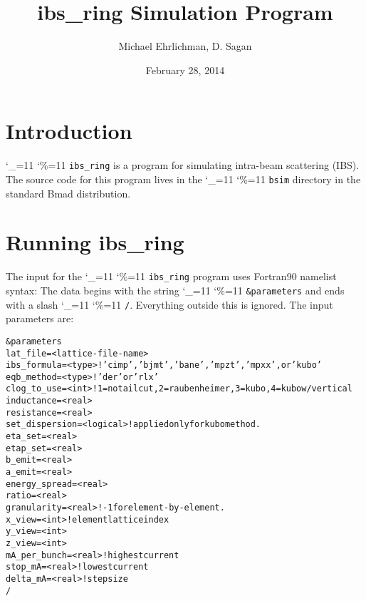 \documentclass[11pt]{article}
\title{ibs_ring Simulation Program}
\author{Michael Ehrlichman, D. Sagan}
\date{February 28, 2014}
\newcommand\ttcmd{\begingroup\catcode`\_=11 \catcode`\%=11 \dottcmd}
\newcommand\dottcmd[1]{\texttt{#1}\endgroup}
\newcommand{\vn}{\ttcmd}
\newlength{\ExBeg}
\newlength{\ExEnd}
\newenvironment{example}
  {\vspace{\ExBeg} \begin{alltt}}
  {\end{alltt} \vspace{\ExEnd}}
\begin{document}
\maketitle

\tableofcontents

\section{Introduction} 
\label{s:intro}

\vn{ibs_ring} is a program for simulating intra-beam scattering (IBS).
The source code for this program lives in the \vn{bsim} directory in
the standard Bmad\cite{b:bmad} distribution.

\section{Running ibs_ring} 
\label{s:run}

The input for the \vn{ibs_ring} program uses Fortran90 namelist
syntax: The data begins with the string \vn{\&parameters} and ends
with a slash \vn{/}. Everything outside this is ignored.
The input parameters are:
\begin{example}
\&parameters
  lat_file = <lattice-file-name>
  ibs_formula = <type>  ! 'cimp', 'bjmt', 'bane', 'mpzt', 'mpxx', or 'kubo'
  eqb_method = <type>   ! 'der' or 'rlx'
  clog_to_use = <int>   ! 1=no tail cut, 2=raubenheimer, 3=kubo, 4=kubo w/vertical
  inductance = <real>
  resistance = <real>
  set_dispersion = <logical> ! applied only for kubo method.
  eta_set = <real>
  etap_set = <real>
  b_emit = <real>
  a_emit = <real>
  energy_spread = <real>
  ratio = <real>
  granularity = <real>   ! -1 for element-by-element.
  x_view = <int>  ! element lattice index 
  y_view = <int>  
  z_view = <int>  
  mA_per_bunch = <real>  ! highest current
  stop_mA = <real>       ! lowest current
  delta_mA = <real>      ! step size
/
\end{example}
\end{document}
